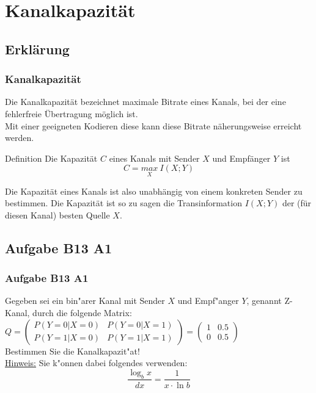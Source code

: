 




\section{Kanalkapazität}
\subsection{Erklärung}
\begin{frame}
	\frametitle{Kanalkapazität}
	Die Kanalkapazität bezeichnet maximale Bitrate eines Kanals, bei der eine fehlerfreie Übertragung möglich ist.\\
	Mit einer geeigneten Kodieren diese kann diese Bitrate näherungsweise erreicht werden.
	\begin{block}{Definition}
	Die Kapazität $C$ eines Kanals mit Sender $X$ und Empfänger $Y$ ist
	\begin{equation}
		C = \underset{X}{max}\ I(X;Y)
	\end{equation}
	\end{block}
	Die Kapazität eines Kanals ist also unabhängig von einem konkreten Sender zu bestimmen. Die Kapazität ist so zu sagen die Transinformation $I(X;Y)$ der (für diesen Kanal) besten Quelle $X$.
\end{frame}
\subsection{Aufgabe B13 A1}
\begin{frame}
\frametitle{Aufgabe B13 A1}
Gegeben sei ein bin"arer Kanal mit Sender $X$ und Empf"anger $Y$, genannt Z-Kanal,
durch die folgende Matrix:\\[4pt]
$Q = \left( \begin{array}{cc}
P(Y=0|X=0) & P(Y=0|X=1) \\ P(Y=1|X=0) & P(Y=1|X=1)
\end{array} \right) = \left( \begin{array}{cc}
1 & 0.5 \\ 0 & 0.5
\end{array} \right)$\\[4pt]
Bestimmen Sie die Kanalkapazit"at!\\[4pt]
\underline{Hinweis:} Sie k"onnen dabei folgendes verwenden:
\[ \frac{\log_b{x}}{dx} = \frac{1}{x \cdot \ln{b}} \]
\end{frame}


